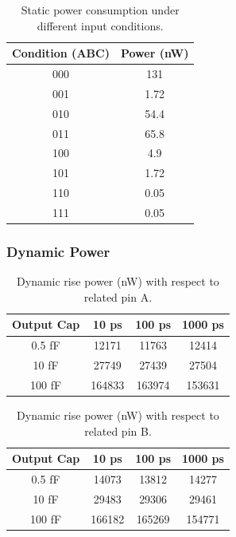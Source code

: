 \documentclass[12pt]{article}
\begin{document}
\begin{table}[H]
	\centering
	\begin{tabular}{|c|c|}
		\hline
		Condition (ABC) & Power (nW) \\
		\hline
		000             & 131        \\
		001             & 1.72       \\
		010             & 54.4       \\
		011             & 65.8       \\
		100             & 4.9        \\
		101             & 1.72       \\
		110             & 0.05       \\
		111             & 0.05       \\
		\hline
	\end{tabular}
	\caption{Static power consumption under different input conditions.}
	\label{tab:static_power}
\end{table}

\subsubsection{Dynamic Power}


\begin{table}[H]
	\centering
	\begin{tabular}{|c|c|c|c|}
		\hline
		Output Cap & 10 ps  & 100 ps & 1000 ps \\
		\hline
		0.5 fF     & 12171  & 11763  & 12414   \\
		10 fF      & 27749  & 27439  & 27504   \\
		100 fF     & 164833 & 163974 & 153631  \\
		\hline
	\end{tabular}
	\caption{Dynamic rise power (nW) with respect to related pin A.}
	\label{tab:rise_power_A}
\end{table}

\begin{table}[H]
	\centering
	\begin{tabular}{|c|c|c|c|}
		\hline
		Output Cap & 10 ps  & 100 ps & 1000 ps \\
		\hline
		0.5 fF     & 14073  & 13812  & 14277   \\
		10 fF      & 29483  & 29306  & 29461   \\
		100 fF     & 166182 & 165269 & 154771  \\
		\hline
	\end{tabular}
	\caption{Dynamic rise power (nW) with respect to related pin B.}
	\label{tab:rise_power_B}
\end{table}
\end{document}
